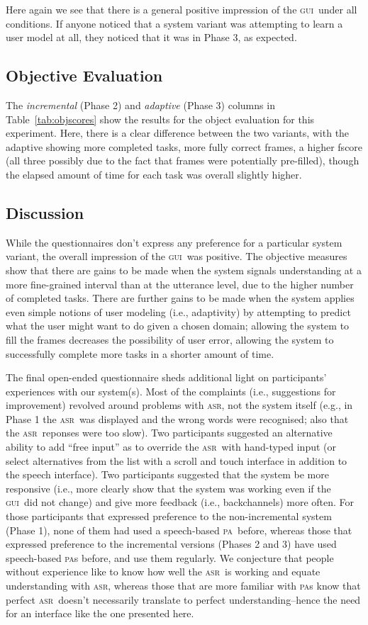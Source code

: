 \documentclass[11pt]{article}
\newcommand{\asr}[0]{\textsc{asr}}
\newcommand{\ui}[0]{\textsc{gui}}
\newcommand{\pa}[0]{\textsc{pa}}
\begin{document}
Here again we see that there is a general positive impression of the \ui\ under all conditions. If anyone noticed that a system variant was attempting to learn a user model at all, they noticed that it was in Phase 3, as expected. 

\subsection{Objective Evaluation} The \emph{incremental} (Phase 2) and \emph{adaptive} (Phase 3) columns in Table~\ref{tab:objscores} show the results for the object evaluation for this experiment. Here, there is a clear difference between the two variants, with the adaptive showing more completed tasks, more fully correct frames, a higher fscore (all three possibly due to the fact that frames were potentially pre-filled), though the elapsed amount of time for each task was overall slightly higher. 

\subsection{Discussion}

While the questionnaires don't express any preference for a particular system variant, the overall impression of the \ui\ was positive. The objective measures show that there are gains to be made when the system signals understanding at a more fine-grained interval than at the utterance level, due to the higher number of completed tasks. There are further gains to be made when the system applies even simple notions of user modeling (i.e., adaptivity) by attempting to predict what the user might want to do given a chosen domain; allowing the system to fill the frames decreases the possibility of user error, allowing the system to successfully complete more tasks in a shorter amount of time. 

The final open-ended questionnaire sheds additional light on participants' experiences with our system(s). Most of the complaints (i.e., suggestions for improvement) revolved around problems with \asr, not the system itself (e.g., in Phase 1 the \asr\ was displayed and the wrong words were recognised; also that the \asr\ reponses were too slow). Two participants suggested an alternative ability to add ``free input'' as to override the \asr\ with hand-typed input (or select alternatives from the list with a scroll and touch interface in addition to the speech interface). Two participants suggested that the system be more responsive (i.e., more clearly show that the system was working even if the \ui\ did not change) and give more feedback (i.e., backchannels) more often. For those participants that expressed preference to the non-incremental system (Phase 1), none of them had used a speech-based \pa\ before, whereas those that expressed preference to the incremental versions (Phases 2 and 3) have used speech-based \pa s before, and use them regularly. We conjecture that people without experience like to know how well the \asr\ is working and equate understanding with \asr, whereas those that are more familiar with \pa s know that perfect \asr\ doesn't necessarily translate to perfect understanding--hence the need for an interface like the one presented here. 
\end{document}
